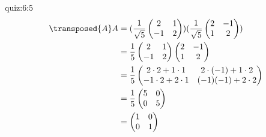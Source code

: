 \begin{answerof}{quiz:6:5}
  \begin{align*}
    \transposed{A}A&=
    (\frac{1}{\sqrt 5}
    \begin{pmatrix}
      2&1\\
      -1&2
    \end{pmatrix})
    (\frac{1}{\sqrt 5}
    \begin{pmatrix}
      2&-1\\
      1&2
    \end{pmatrix})\\
    &=
    \frac{1}{5}
    \begin{pmatrix}
      2&1\\
      -1&2
    \end{pmatrix}
    \begin{pmatrix}
      2&-1\\
      1&2
    \end{pmatrix}\\
    &=
    \frac{1}{5}
    \begin{pmatrix}
      2\cdot 2+1\cdot 1&2\cdot (-1)+1\cdot 2\\
      -1\cdot 2+2\cdot 1&(-1)(-1)+2\cdot 2
    \end{pmatrix}\\
    &=
    \frac{1}{5}
    \begin{pmatrix}
      5&0\\
      0&5
    \end{pmatrix}\\
    &=
    \begin{pmatrix}
      1&0\\
      0&1
    \end{pmatrix}
  \end{align*}
  
\end{answerof}

